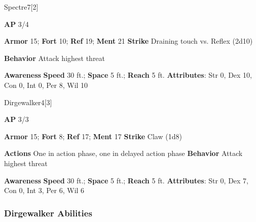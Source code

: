 \begin{monsection}{Spectre}{7}[2]
\vspace{-1em}\vspace{-1em}
\begin{spellcontent}
\begin{spelltargetinginfo}
{\textbf{AP} 3/4}

\pari \textbf{Armor} 15;
\textbf{Fort} 10;
\textbf{Ref} 19;
\textbf{Ment} 21
\pari \textbf{Strike} Draining touch  vs. Reflex (2d10)



\pari \textbf{Behavior} Attack highest threat
\end{spelltargetinginfo}
\end{spellcontent}

\begin{monsterfooter}
\pari \textbf{Awareness} 
\pari \textbf{Speed} 30 ft.;
\textbf{Space} 5 ft.;
\textbf{Reach} 5 ft.
\pari \textbf{Attributes}:
Str 0,
Dex 10,
Con 0,
Int 0,
Per 8,
Wil 10
\end{monsterfooter}
\end{monsection}

\begin{monsection}{Dirgewalker}{4}[3]
\vspace{-1em}\vspace{-1em}
\begin{spellcontent}
\begin{spelltargetinginfo}
{\textbf{AP} 3/3}

\pari \textbf{Armor} 15;
\textbf{Fort} 8;
\textbf{Ref} 17;
\textbf{Ment} 17
\pari \textbf{Strike} Claw  (1d8)


\pari \textbf{Actions} One in action phase, one in delayed action phase
\pari \textbf{Behavior} Attack highest threat
\end{spelltargetinginfo}
\end{spellcontent}

\begin{monsterfooter}
\pari \textbf{Awareness} 
\pari \textbf{Speed} 30 ft.;
\textbf{Space} 5 ft.;
\textbf{Reach} 5 ft.
\pari \textbf{Attributes}:
Str 0,
Dex 7,
Con 0,
Int 3,
Per 6,
Wil 6
\end{monsterfooter}
\end{monsection}


\subsubsection{Dirgewalker Abilities}

